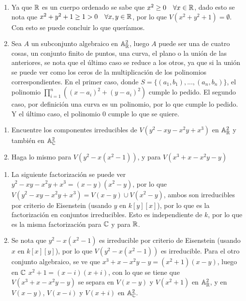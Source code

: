 \begin{sol}{1.30}
    \begin{enumerate}
        \item Ya que \(\mathbb{R}\) es un cuerpo ordenado se sabe que \(x^2\geq0\quad\forall x\in\mathbb{R}\), dado esto se nota que \(x^2+y^2+1\geq1>0\quad\forall x,y\in\mathbb{R}\), por lo que \(V(x^2+y^2+1)=\emptyset\). Con esto se puede concluir lo que queríamos.
        \item Sea \(A\) un subconjunto algebraico en \(\mathbb{A}_{\mathbb{R}}^2\), luego \(A\) puede ser una de cuatro cosas, un conjunto finito de puntos, una curva, el plano o la unión de las anteriores, se nota que el último caso se reduce a los otros, ya que si la unión se puede ver como los ceros de la multiplicación de los polinomios correspondientes. En el primer caso, donde \(S=\{(a_1,b_1),...,(a_n,b_n)\}\), el polinomio \(\prod_{i=1}^n((x-a_i)^2+(y-a_i)^2)\) cumple lo pedido. El segundo caso, por definición una curva es un polinomio, por lo que cumple lo pedido. Y el último caso, el polinomio \(0\) cumple lo que se quiere.
    \end{enumerate}
\end{sol}

\begin{prob}{1.31}
    \begin{enumerate}
        \item Encuentre los componentes irreducibles de \(V(y^2-xy-x^2y+x^3)\) en \(\mathbb{A}_{\mathbb{R}}^2\) y también en \(\mathbb{A}_{\mathbb{C}}^2\)
        \item Haga lo mismo para \(V(y^2-x(x^2-1))\), y para \(V(x^3+x-x^2y-y)\)%
    \end{enumerate}
\end{prob}

\begin{sol}{1.31}
    \begin{enumerate}
        \item La siguiente factorización se puede ver \(y^2-xy-x^2y+x^3=(x-y)(x^2-y)\), por lo que \(V(y^2-xy-x^2y+x^3)=V(x-y)\cup V(x^2-y)\), ambos son irreducibles por criterio de Eisenstein (usando \(y\) en \(k[y][x]\)), por lo que es la factorización en conjuntos irreducibles. Esto es independiente de \(k\), por lo que es la misma factorización para \(\mathbb{C}\) y para \(\mathbb{R}\).
        \item Se nota que \(y^2-x(x^2-1)\) es irreducible por criterio de Eisenstein (usando \(x\) en \(k[x][y]\)), por lo que \(V(y^2-x(x^2-1))\) es irreducible. Para el otro conjunto algebraico, se ve que \(x^3+x-x^2y-y=(x^2+1)(x-y)\), luego en \(\mathbb{C}\) \(x^2+1=(x-i)(x+i)\), con lo que se tiene que \(V(x^3+x-x^2y-y)\) se separa en \(V(x-y)\) y \(V(x^2+1)\) en \(\mathbb{A}_{\mathbb{R}}^2\), y en \(V(x-y)\), \(V(x-i)\) y \(V(x+i)\) en \(\mathbb{A}_{\mathbb{C}}^2\).
    \end{enumerate}
\end{sol}

